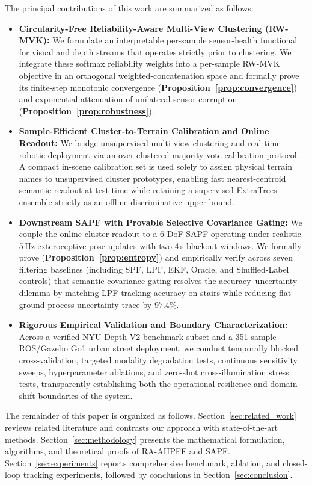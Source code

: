 \documentclass[11pt, a4paper]{article}
\begin{document}
The principal contributions of this work are summarized as follows:
\begin{itemize}
    \item \textbf{Circularity-Free Reliability-Aware Multi-View Clustering (RW-MVK):} We formulate an interpretable per-sample sensor-health functional for visual and depth streams that operates strictly prior to clustering. We integrate these softmax reliability weights into a per-sample RW-MVK objective in an orthogonal weighted-concatenation space and formally prove its finite-step monotonic convergence (\textbf{Proposition~\ref{prop:convergence}}) and exponential attenuation of unilateral sensor corruption (\textbf{Proposition~\ref{prop:robustness}}).
    \item \textbf{Sample-Efficient Cluster-to-Terrain Calibration and Online Readout:} We bridge unsupervised multi-view clustering and real-time robotic deployment via an over-clustered majority-vote calibration protocol. A compact in-scene calibration set is used solely to assign physical terrain names to unsupervised cluster prototypes, enabling fast nearest-centroid semantic readout at test time while retaining a supervised ExtraTrees ensemble strictly as an offline discriminative upper bound.
    \item \textbf{Downstream SAPF with Provable Selective Covariance Gating:} We couple the online cluster readout to a 6-DoF SAPF operating under realistic 5\,Hz exteroceptive pose updates with two 4\,s blackout windows. We formally prove (\textbf{Proposition~\ref{prop:entropy}}) and empirically verify across seven filtering baselines (including SPF, LPF, EKF, Oracle, and Shuffled-Label controls) that semantic covariance gating resolves the accuracy--uncertainty dilemma by matching LPF tracking accuracy on stairs while reducing flat-ground process uncertainty trace by $97.4\%$.
    \item \textbf{Rigorous Empirical Validation and Boundary Characterization:} Across a verified NYU Depth V2 benchmark subset and a 351-sample ROS/Gazebo Go1 urban street deployment, we conduct temporally blocked cross-validation, targeted modality degradation tests, continuous sensitivity sweeps, hyperparameter ablations, and zero-shot cross-illumination stress tests, transparently establishing both the operational resilience and domain-shift boundaries of the system.
\end{itemize}

The remainder of this paper is organized as follows. Section~\ref{sec:related_work} reviews related literature and contrasts our approach with state-of-the-art methods. Section~\ref{sec:methodology} presents the mathematical formulation, algorithms, and theoretical proofs of RA-AHPFF and SAPF. Section~\ref{sec:experiments} reports comprehensive benchmark, ablation, and closed-loop tracking experiments, followed by conclusions in Section~\ref{sec:conclusion}.
\end{document}

